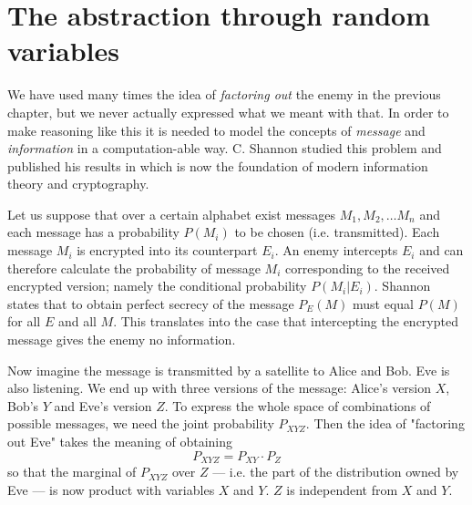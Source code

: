 \section{The abstraction through random variables}
    We have used many times the idea of \textit{factoring out} the enemy in the previous chapter, but we never actually expressed what we meant with that.
    In order to make reasoning like this it is needed to model the concepts of \textit{message} and \textit{information} in a computation-able way.
    C. Shannon studied this problem and published his results in \cite{Shannon49} which is now the foundation of modern information theory and cryptography.
    
    Let us suppose that over a certain alphabet exist messages $M_1,M_2,\ldots M_n$ and each message has a probability $P(M_i)$ to be chosen (i.e. transmitted).
    Each message $M_i$ is encrypted into its counterpart $E_i$.
    An enemy intercepts $E_i$ and can therefore calculate the probability of message $M_i$ corresponding to the received encrypted version; namely the conditional probability $P(M_i|E_i)$.
    Shannon states that to obtain perfect secrecy of the message $P_E(M)$ must equal $P(M)$ for all $E$ and all $M$.
    This translates into the case that intercepting the encrypted message gives the enemy no information.
    
    Now imagine the message is transmitted by a satellite to Alice and Bob.
    Eve is also listening.
    We end up with three versions of the message\footnotemark : Alice's version $X$, Bob's $Y$ and Eve's version $Z$.
    To express the whole space of combinations of possible messages, we need the joint probability $P_{XYZ}$.
    Then the idea of "factoring out Eve" takes the meaning of obtaining 
    $$P_{XYZ} = P_{XY}\cdot P_Z$$
    so that the marginal of $P_{XYZ}$ over $Z$ --- i.e. the part of the distribution owned by Eve --- is now product with variables $X$ and $Y$. $Z$ is independent from $X$ and $Y$.
    
    
    
    
